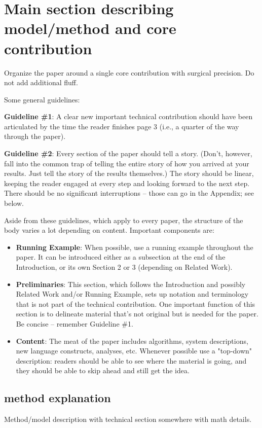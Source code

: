 \documentclass{article}
\begin{document}
\section{Main section describing model/method and core contribution}
\label{body}

Organize the paper around a single core contribution with surgical precision. Do not add additional fluff.

Some general guidelines:

\textbf{Guideline \#1}: A clear new important technical contribution should have been articulated by the time the reader finishes page 3 (i.e., a quarter of the way through the paper).

\textbf{Guideline \#2}: Every section of the paper should tell a story. (Don't, however, fall into the common trap of telling the entire story of how you arrived at your results. Just tell the story of the results themselves.) The story should be linear, keeping the reader engaged at every step and looking forward to the next step. There should be no significant interruptions -- those can go in the Appendix; see below.

Aside from these guidelines, which apply to every paper, the structure of the body varies a lot depending on content. Important components are:

\begin{itemize}

    \item \textbf{Running Example}: When possible, use a running example throughout the paper. It can be introduced either as a subsection at the end of the Introduction, or its own Section 2 or 3 (depending on Related Work).
    \item \textbf{Preliminaries}: This section, which follows the Introduction and possibly Related Work and/or Running Example, sets up notation and terminology that is not part of the technical contribution. One important function of this section is to delineate material that's not original but is needed for the paper. Be concise -- remember Guideline \#1.
    \item \textbf{Content}: The meat of the paper includes algorithms, system descriptions, new language constructs, analyses, etc. Whenever possible use a "top-down" description: readers should be able to see where the material is going, and they should be able to skip ahead and still get the idea.
\end{itemize}


\subsection{method explanation}
Method/model description with technical section somewhere with math details.
\end{document}
